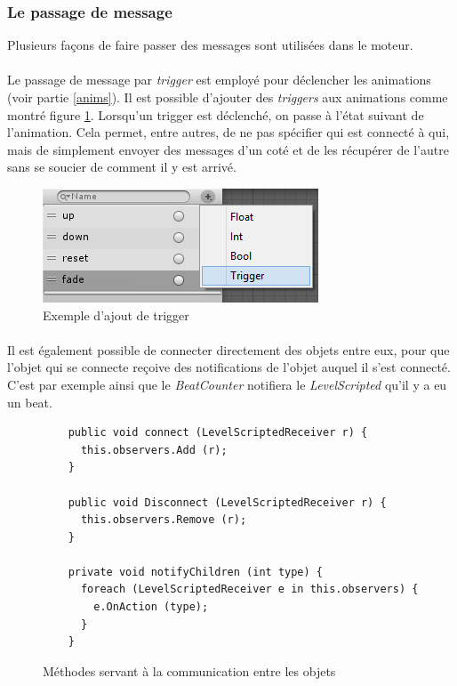 \subsubsection{Le passage de message}
Plusieurs façons de faire passer des messages sont utilisées dans le moteur. 
\paragraph{}
Le passage de message par \textit{trigger} est employé pour déclencher les animations (voir partie \ref{anims}). Il est possible d'ajouter des \textit{triggers} aux animations comme montré figure \ref{trigger}. Lorsqu'un trigger est déclenché, on passe à l'état suivant de l'animation. Cela permet, entre autres, de ne pas spécifier qui est connecté à qui, mais de simplement envoyer des messages d'un coté et de les récupérer de l'autre sans se soucier de comment il y est arrivé.

\begin{figure}[H]\centering
  \includegraphics[scale=1]{./img/anims.png}
  \caption{Exemple d'ajout de trigger}
  \label{trigger}
\end{figure}

\paragraph{}
Il est également possible de connecter directement des objets entre eux, pour que l'objet qui se connecte reçoive des notifications de l'objet auquel il s'est connecté. C'est par exemple ainsi que le \textit{BeatCounter} notifiera le \textit{LevelScripted} qu'il y a eu un beat.

\begin{figure}[H]\centering
  \begin{lstlisting}
    public void connect (LevelScriptedReceiver r) {
      this.observers.Add (r);
    }

    public void Disconnect (LevelScriptedReceiver r) {
      this.observers.Remove (r);
    }

    private void notifyChildren (int type) {
      foreach (LevelScriptedReceiver e in this.observers) {
        e.OnAction (type);
      }
    }
  \end{lstlisting}
\label{connection}
\caption{Méthodes servant à la communication entre les objets}
\end{figure}

